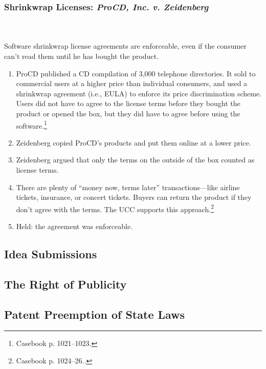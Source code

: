 \subsubsection{Shrinkwrap Licenses: \emph{ProCD, Inc. v. Zeidenberg}}
~\\\\
Software shrinkwrap license agreements are enforceable, even if the consumer 
can't read them until he has bought the product.

\begin{enumerate}
    \item ProCD published a CD compilation of 3,000 telephone directories. It 
    sold to commercial users at a higher price than individual consumers, and 
    used a shrinkwrap agreement (i.e., EULA) to enforce its price 
    discrimination scheme. Users did not have to agree to the license terms 
    before they bought the product or opened the box, but they did have to 
    agree before using the software.\footnote{Casebook p. 1021--1023.}
    \item Zeidenberg copied ProCD's products and put them online at a lower 
    price.
    \item Zeidenberg argued that only the terms on the outside of the box 
    counted as license terms.
    \item There are plenty of ``money now, terms later'' transactions---like 
    airline tickets, insurance, or concert tickets. Buyers can return the 
    product if they don't agree with the terms. The UCC supports this 
    approach.\footnote{Casebook p. 1024--26..}
    \item Held: the agreement was enforceable.
\end{enumerate}

\subsection{Idea Submissions}


\subsection{The Right of Publicity}


\subsection{Patent Preemption of State Laws}

